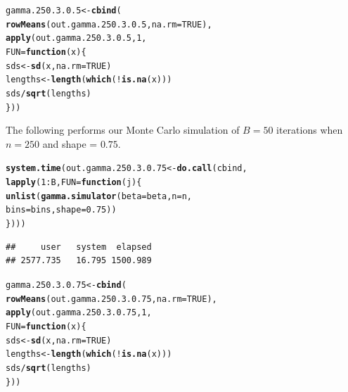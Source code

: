 \documentclass[11pt]{article}\usepackage[]{graphicx}\usepackage[]{color}
\makeatletter
\newcommand{\hlnum}[1]{\textcolor[rgb]{0.686,0.059,0.569}{#1}}%
\newcommand{\hlopt}[1]{\textcolor[rgb]{0,0,0}{#1}}%
\newcommand{\hlstd}[1]{\textcolor[rgb]{0.345,0.345,0.345}{#1}}%
\newcommand{\hlkwa}[1]{\textcolor[rgb]{0.161,0.373,0.58}{\textbf{#1}}}%
\newcommand{\hlkwb}[1]{\textcolor[rgb]{0.69,0.353,0.396}{#1}}%
\newcommand{\hlkwc}[1]{\textcolor[rgb]{0.333,0.667,0.333}{#1}}%
\newcommand{\hlkwd}[1]{\textcolor[rgb]{0.737,0.353,0.396}{\textbf{#1}}}%
\newenvironment{kframe}{%
 \def\at@end@of@kframe{}%
 \ifinner\ifhmode%
  \def\at@end@of@kframe{\end{minipage}}%
  \begin{minipage}{\columnwidth}%
 \fi\fi%
 \def\FrameCommand##1{\hskip\@totalleftmargin \hskip-\fboxsep
 \colorbox{shadecolor}{##1}\hskip-\fboxsep
     \hskip-\linewidth \hskip-\@totalleftmargin \hskip\columnwidth}%
 \MakeFramed {\advance\hsize-\width
   \@totalleftmargin\z@ \linewidth\hsize
   \@setminipage}}%
 {\par\unskip\endMakeFramed%
 \at@end@of@kframe}
\newenvironment{knitrout}{}{} %
\makeatother
\begin{document}
\begin{knitrout}
\color{fgcolor}\begin{kframe}
\begin{alltt}
\hlstd{gamma.250.3.0.5} \hlkwb{<-} \hlkwd{cbind}\hlstd{(}
  \hlkwd{rowMeans}\hlstd{(out.gamma.250.3.0.5,} \hlkwc{na.rm} \hlstd{=} \hlnum{TRUE}\hlstd{),}
  \hlkwd{apply}\hlstd{(out.gamma.250.3.0.5,} \hlnum{1}\hlstd{,}
  \hlkwc{FUN} \hlstd{=} \hlkwa{function}\hlstd{(}\hlkwc{x}\hlstd{)\{}
    \hlstd{sds} \hlkwb{<-} \hlkwd{sd}\hlstd{(x,} \hlkwc{na.rm} \hlstd{=} \hlnum{TRUE}\hlstd{)}
    \hlstd{lengths} \hlkwb{<-} \hlkwd{length}\hlstd{(}\hlkwd{which}\hlstd{(}\hlopt{!}\hlkwd{is.na}\hlstd{(x)))}
    \hlstd{sds} \hlopt{/} \hlkwd{sqrt}\hlstd{(lengths)}
  \hlstd{\}))}
\end{alltt}
\end{kframe}
\end{knitrout}

The following performs our Monte Carlo simulation of $B = 50$ iterations 
when $n = 250$ and shape = $0.75$.

\begin{knitrout}
\color{fgcolor}\begin{kframe}
\begin{alltt}
\hlkwd{system.time}\hlstd{(out.gamma.250.3.0.75} \hlkwb{<-} \hlkwd{do.call}\hlstd{(cbind,}
  \hlkwd{lapply}\hlstd{(}\hlnum{1}\hlopt{:}\hlstd{B,} \hlkwc{FUN} \hlstd{=} \hlkwa{function}\hlstd{(}\hlkwc{j}\hlstd{)\{}
    \hlkwd{unlist}\hlstd{(}\hlkwd{gamma.simulator}\hlstd{(}\hlkwc{beta} \hlstd{= beta,} \hlkwc{n} \hlstd{= n,}
      \hlkwc{bins} \hlstd{= bins,} \hlkwc{shape} \hlstd{=} \hlnum{0.75}\hlstd{))}
\hlstd{\})))}
\end{alltt}
\begin{verbatim}
##     user   system  elapsed 
## 2577.735   16.795 1500.989
\end{verbatim}
\end{kframe}
\end{knitrout}

\begin{knitrout}
\color{fgcolor}\begin{kframe}
\begin{alltt}
\hlstd{gamma.250.3.0.75} \hlkwb{<-} \hlkwd{cbind}\hlstd{(}
  \hlkwd{rowMeans}\hlstd{(out.gamma.250.3.0.75,} \hlkwc{na.rm} \hlstd{=} \hlnum{TRUE}\hlstd{),}
  \hlkwd{apply}\hlstd{(out.gamma.250.3.0.75,} \hlnum{1}\hlstd{,}
  \hlkwc{FUN} \hlstd{=} \hlkwa{function}\hlstd{(}\hlkwc{x}\hlstd{)\{}
    \hlstd{sds} \hlkwb{<-} \hlkwd{sd}\hlstd{(x,} \hlkwc{na.rm} \hlstd{=} \hlnum{TRUE}\hlstd{)}
    \hlstd{lengths} \hlkwb{<-} \hlkwd{length}\hlstd{(}\hlkwd{which}\hlstd{(}\hlopt{!}\hlkwd{is.na}\hlstd{(x)))}
    \hlstd{sds} \hlopt{/} \hlkwd{sqrt}\hlstd{(lengths)}
  \hlstd{\}))}
\end{alltt}
\end{kframe}
\end{knitrout}
\end{document}

